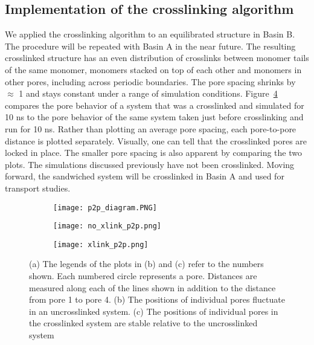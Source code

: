 \subsection*{Implementation of the crosslinking algorithm}

We applied the crosslinking algorithm to an equilibrated structure in Basin B.
The procedure will be repeated with Basin A in the near future.
The resulting crosslinked structure has an even distribution of
crosslinks between monomer tails of the same monomer, monomers stacked on  %
top of each other and monomers in other pores, including across periodic
boundaries. The pore spacing shrinks by $\approx$ 1 \angstrom and stays 
constant under a range of simulation conditions. Figure~\ref{fig:xlink} compares
the pore behavior of a system that was a crosslinked and simulated for 10 ns to 
the pore behavior of the same system taken just before crosslinking and run for 10 ns.
Rather than plotting an average pore spacing, each pore-to-pore distance is plotted
separately. Visually, one can tell that the crosslinked pores are locked in place. 
The smaller pore spacing is also apparent by comparing the two plots. 
The simulations discussed previously have not been crosslinked. Moving forward,
the sandwiched system will be crosslinked in Basin A and used for
transport studies.

\begin{figure}[H]
	\centering
	\begin{subfigure}{0.31\textwidth}
		\centering
		\texttt{[image: p2p\_diagram.PNG]}
		\caption{}\label{fig:p2p_diagram}
	\end{subfigure}
		\begin{subfigure}{0.31\textwidth}
		\centering
		\texttt{[image: no\_xlink\_p2p.png]}
		\caption{}\label{fig:no_xlink_p2p}
	\end{subfigure}
		\begin{subfigure}{0.31\textwidth}
		\centering
		\texttt{[image: xlink\_p2p.png]}
		\caption{}\label{fig:xlink_p2p}
	\end{subfigure}
	\caption{(a) The legends of the plots in (b) and (c) refer to the numbers shown.
	Each numbered circle represents a pore. Distances are measured along each of the 
	lines shown in addition to the distance from pore 1 to pore 4. (b) The positions
	of individual pores fluctuate in an uncrosslinked system. (c) The positions of
	individual pores in the crosslinked system are stable relative to the uncrosslinked
	system}\label{fig:xlink}
\end{figure}
